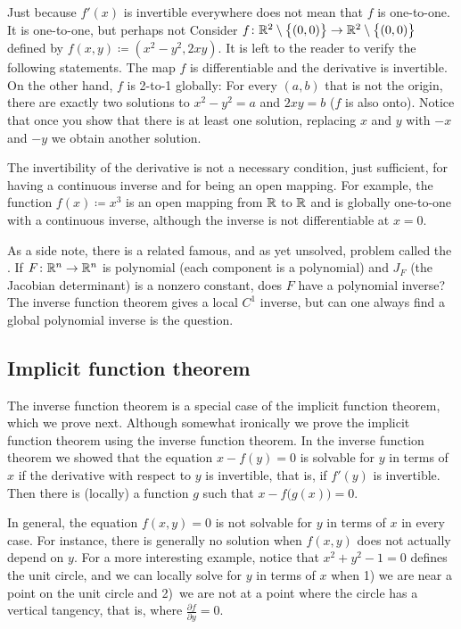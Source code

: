 \begin{example}
Just because $f'(x)$ is invertible everywhere does not
mean that $f$ is
one-to-one.  It is  one-to-one, but perhaps not
Consider $f \colon {\mathbb{R}}^2 \setminus \bigl\{ (0,0) \bigr\} \to
{\mathbb{R}}^2 \setminus \bigl\{ (0,0) \bigr\}$ defined
by $f(x,y) \coloneqq (x^2-y^2,2xy)$.
It is left to the reader to verify the following statements.
The map $f$ is differentiable and the derivative is invertible.
On the other hand, $f$ is 2-to-1 globally: For every
$(a,b)$ that is not the origin, there are exactly two
solutions to $x^2-y^2=a$ and $2xy=b$ ($f$ is also onto).  Notice that
once you show that there is at least one solution,
replacing $x$ and $y$ with $-x$ and $-y$ we obtain another solution.
\end{example}

The invertibility of the derivative is not a necessary
condition, just sufficient, for having a continuous inverse and for being an open
mapping.  For example, the function $f(x) \coloneqq x^3$ is an open mapping from ${\mathbb{R}}$
to ${\mathbb{R}}$ and is globally one-to-one with a continuous inverse, although the
inverse is not differentiable at $x=0$.

\medskip

As a side note, there is a related famous, and as yet unsolved, problem
called the \emph{}.  If $F \colon {\mathbb{R}}^n \to
{\mathbb{R}}^n$ is polynomial (each component is a polynomial) and $J_F$
(the Jacobian determinant) is a nonzero
constant, does $F$ have a polynomial inverse?
The inverse function theorem gives a local $C^1$ inverse, but can one always
find a global polynomial inverse is the question.

\subsection{Implicit function theorem}

The inverse function theorem is a special case of the implicit
function theorem, which we prove next.  Although somewhat ironically we 
prove the implicit function theorem using the inverse function theorem.
In the inverse function theorem we showed that
the equation $x-f(y) = 0$ is solvable for $y$ in terms of $x$ if the derivative
with respect to $y$ is invertible, that is, if $f'(y)$ is invertible.
Then there is (locally) a
function $g$ such that $x-f\bigl(g(x)\bigr) = 0$.

In general, the equation $f(x,y) = 0$ is
not solvable for $y$ in terms of $x$ in every case.
For instance, there is generally no solution
when $f(x,y)$ does not actually depend on $y$.
For a more interesting example, notice that $x^2+y^2-1 = 0$ defines the unit circle, and
we can locally solve for $y$ in terms of $x$ when 1) we are near
a point on the unit circle and 2)~we are not at a point
where the circle has a vertical tangency, that is, where
$\frac{\partial f}{\partial y} = 0$.

